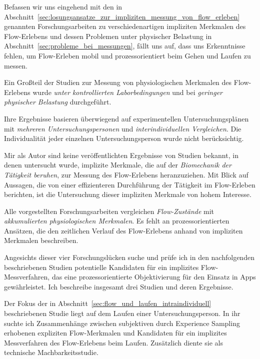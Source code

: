 

Befassen wir uns eingehend mit den in Abschnitt~\ref{sec:losungsansatze_zur_impliziten_messung_von_flow_erleben} genannten Forschungsarbeiten zu verschiedenartigen impliziten Merkmalen des Flow-Erlebens und dessen Problemen unter physischer Belastung in Abschnitt~\ref{sec:probleme_bei_messungen}, fällt uns auf, dass uns Erkenntnisse fehlen, um Flow-Erleben mobil und prozessorientiert beim Gehen und Laufen zu messen.

Ein Großteil der Studien zur Messung von physiologischen Merkmalen des Flow-Erlebens wurde \emph{unter kontrollierten Laborbedingungen} und bei \emph{geringer physischer Belastung} durchgeführt. 

Ihre Ergebnisse basieren überwiegend auf experimentellen Untersuchungsplänen mit \emph{mehreren Untersuchungspersonen} und \emph{interindividuellen Vergleichen}. Die Individualität jeder einzelnen Untersuchungsperson wurde nicht berücksichtig.

Mir als Autor sind keine veröffentlichten Ergebnisse von Studien bekannt, in denen untersucht wurde, implizite Merkmale, die auf der \emph{Biomechanik der Tätigkeit beruhen}, zur Messung des Flow-Erlebens heranzuziehen. Mit Blick auf Aussagen, die von einer effizienteren Durchführung der Tätigkeit im Flow-Erleben berichten, ist die Untersuchung dieser impliziten Merkmale von hohem Interesse.

Alle vorgestellten Forschungsarbeiten vergleichen \emph{Flow-Zustände} mit \emph{akkumulierten physiologischen Merkmalen}. Es fehlt an prozessorientierten Ansätzen, die den zeitlichen Verlauf des Flow-Erlebens anhand von impliziten Merkmalen beschreiben.

Angesichts dieser vier Forschungslücken suche und prüfe ich in den nachfolgenden beschriebenen Studien potentielle Kandidaten für ein implizites Flow-Messverfahren, das eine prozessorientierte Objektivierung für den Einsatz in Apps gewährleistet. Ich beschreibe insgesamt drei Studien und deren Ergebnisse.

Der Fokus der in Abschnitt~\ref{sec:flow_und_laufen_intraindividuell} beschriebenen Studie liegt auf dem Laufen einer Untersuchungsperson. In ihr suchte ich Zusammenhänge zwischen subjektiven durch Experience Sampling erhobenen expliziten Flow-Merkmalen und Kandidaten für ein implizites Messverfahren des Flow-Erlebens beim Laufen. Zusätzlich diente sie als technische Machbarkeitsstudie. 

